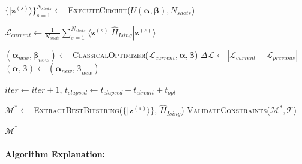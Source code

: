 \documentclass[lettersize,journal]{IEEEtran}
\begin{document}
\begin{algorithm}[t]
{{        
        \label{line:execute}
        $\{|\mathbf{z}^{(s)}\rangle\}_{s=1}^{N_{shots}} \leftarrow$ \textsc{ExecuteCircuit}($U(\boldsymbol{\alpha}, \boldsymbol{\beta}), N_{shots}$)\;
        
        \label{line:expect_start}
        $\mathcal{L}_{current} \leftarrow \frac{1}{N_{shots}} \sum_{s=1}^{N_{shots}} \langle \mathbf{z}^{(s)} | \hat{H}_{Ising} | \mathbf{z}^{(s)} \rangle$\;
        \label{line:expect_end}
        
        \label{line:update_start}
        $(\boldsymbol{\alpha}_{new}, \boldsymbol{\beta}_{new}) \leftarrow$ \textsc{ClassicalOptimizer}($\mathcal{L}_{current}, \boldsymbol{\alpha}, \boldsymbol{\beta}$) 
        \label{line:convergence}
        $\Delta \mathcal{L} \leftarrow |\mathcal{L}_{current} - \mathcal{L}_{previous}|$\;
        \label{line:update_params}
        $(\boldsymbol{\alpha}, \boldsymbol{\beta}) \leftarrow (\boldsymbol{\alpha}_{new}, \boldsymbol{\beta}_{new})$\;
        \label{line:update_end}
        
        \label{line:iter_update}
        $iter \leftarrow iter + 1$, $t_{elapsed} \leftarrow t_{elapsed} + t_{circuit} + t_{opt}$\;
    }
    \label{line:loop_end}
    
    \label{line:extract}
    $\mathcal{M}^* \leftarrow$ \textsc{ExtractBestBitstring}($\{|\mathbf{z}^{(s)}\rangle\}$, $\hat{H}_{Ising}$)\;
    \label{line:validate}
    \textsc{ValidateConstraints}($\mathcal{M}^*, \mathcal{T}$) 
    
}
\label{line:else_start}
\label{line:else_end}

\label{line:return}
\Return $\mathcal{M}^*$\;
\end{algorithm}

\paragraph{Algorithm Explanation:}
\end{document}
